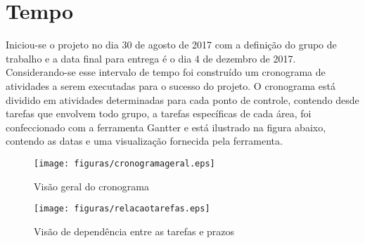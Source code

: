 \section{Tempo}

Iniciou-se o projeto no dia 30 de agosto de 2017 com a definição do grupo de trabalho e a data final para entrega é o dia 4 de dezembro de 2017. Considerando-se esse intervalo de tempo foi construído um cronograma de atividades a serem executadas para o sucesso do projeto.
O cronograma está dividido em atividades determinadas para cada ponto de controle, contendo desde tarefas que envolvem todo grupo, a tarefas específicas de cada área, foi confeccionado com a ferramenta Gantter e está ilustrado na figura abaixo, contendo as datas e uma visualização fornecida pela ferramenta.

\begin{figure}[!htb]
   \centering
   \texttt{[image: figuras/cronogramageral.eps]}
   \caption{Visão geral do cronograma}
\end{figure}


\begin{figure}[!htb]
   \centering
   \texttt{[image: figuras/relacaotarefas.eps]}
   \caption{Visão de dependência entre as tarefas e prazos}
\end{figure}
